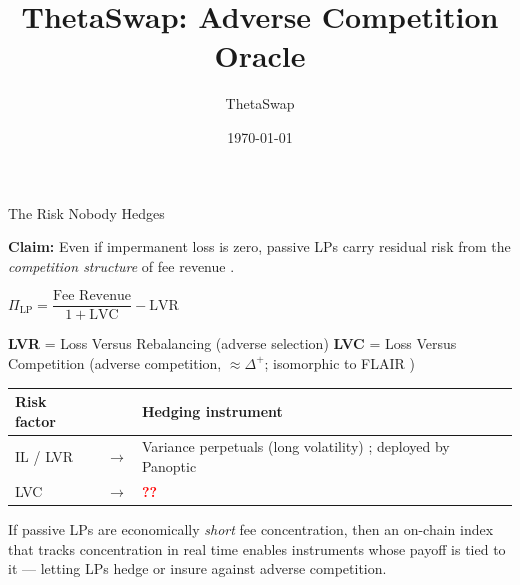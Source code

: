 \documentclass[aspectratio=169]{beamer}
\title{ThetaSwap: Adverse Competition Oracle}
\author{ThetaSwap}
\date{\today}
\newcommand{\DeltaPlus}{\Delta^{+}}
\begin{document}
\begin{frame}[plain]
\titlepage
\end{frame}

\begin{frame}{The Risk Nobody Hedges}

\textbf{Claim:} Even if impermanent loss is zero, passive LPs carry residual
risk from the \emph{competition structure} of fee revenue
\citep{capponi2024jit, aquilina2024dealers}.

\bigskip

\begin{center}
$\Pi_{\text{LP}} = \dfrac{\text{Fee Revenue}}{1 + \text{LVC}} - \text{LVR}$
\end{center}

\medskip

{\small
\textbf{LVR} = Loss Versus Rebalancing (adverse selection) \quad
\textbf{LVC} = Loss Versus Competition (adverse competition, $\approx \DeltaPlus$;
isomorphic to FLAIR \citep{milionis2024flair})
}

\bigskip

\renewcommand{\arraystretch}{1.6}
\begin{tabular}{@{}lcp{6.5cm}@{}}

\toprule
\textbf{Risk factor} & & \textbf{Hedging instrument} \\
\midrule
IL / LVR & $\longrightarrow$ & Variance perpetuals (long volatility)
  \citep{fukasawa2023weighted}; deployed by Panoptic
  \citep{kristensen2024perpetual} \\
LVC & $\longrightarrow$ & \textcolor{red}{\textbf{??}} \\
\bottomrule
\end{tabular}


\end{frame}

\begin{frame}{}
\vfill
\begin{center}
\large
If passive LPs are economically \emph{short} fee concentration, then an
on-chain index that tracks concentration in real time enables instruments
whose payoff is tied to it --- letting LPs hedge or insure against adverse
competition.
\end{center}
\vfill
\end{frame}
\end{document}
